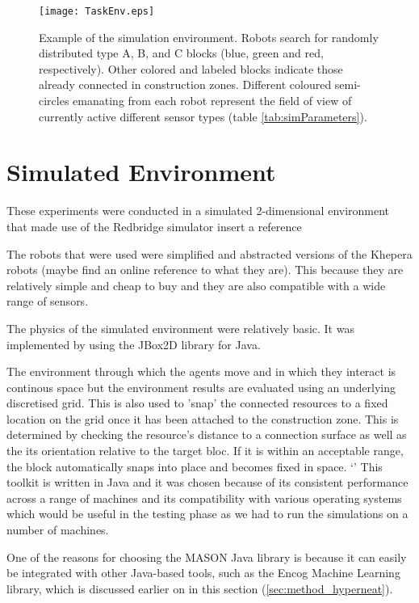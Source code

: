 \begin{figure}[t]
	\centering
	\texttt{[image: TaskEnv.eps]}
\caption{Example of the simulation environment.  Robots search for randomly distributed
type A, B, and C blocks (blue, green and red, respectively).  Other colored and labeled
blocks indicate those already connected in construction zones.
Different coloured semi-circles emanating from each
robot represent the field of view of currently active different sensor types (table \ref{tab:simParameters}).}\label{fig:taskEnv}
\end{figure}




\section{Simulated Environment}

These experiments were conducted in a simulated 2-dimensional environment that made use of the Redbridge simulator {insert a reference}

The robots that were used were simplified and abstracted versions of the Khepera robots (maybe find an online reference to what they are). This because they are relatively simple and cheap to buy and they are also compatible with a wide range of sensors.

The physics of the simulated environment were relatively basic. It was implemented by using the JBox2D library for Java.

The environment through which the agents move and in which they interact is continous space but the environment results are evaluated using an underlying discretised grid. This is also used to 'snap' the connected resources to a fixed location on the grid once it has been attached to the construction zone. This is determined by checking the resource's distance to a connection surface as well as the its orientation relative to the target bloc. If it is within an acceptable range, the block automatically snaps into place and becomes fixed in space.
`'
This toolkit is written in Java and it was chosen because of its consistent performance across a range of machines and its compatibility with various operating systems which would be useful in the testing phase as we had to run the simulations on a number of machines.

One of the reasons for choosing the MASON Java library is because it can easily be integrated with other Java-based tools, such as the Encog Machine Learning library, which is discussed earlier on in this section (\ref{sec:method_hyperneat}).

